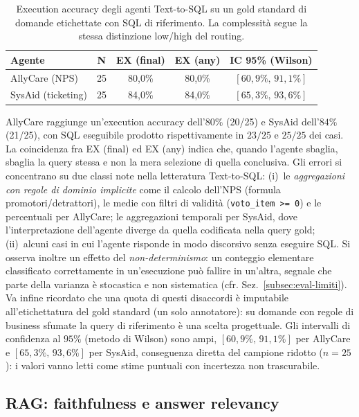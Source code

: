 \begin{table}[htbp]
  \centering
  \caption[Execution accuracy degli agenti Text-to-SQL]{Execution accuracy degli agenti Text-to-SQL su un gold standard di domande etichettate con SQL di riferimento. La complessità segue la stessa distinzione low/high del routing.}
  \label{tab:eval-text2sql}
  \begin{tabular}{lcccc}
    \toprule
    \textbf{Agente} & \textbf{N} & \textbf{EX (final)} & \textbf{EX (any)} & \textbf{IC 95\% (Wilson)} \\
    \midrule
    AllyCare (NPS)      & 25 & 80{,}0\% & 80{,}0\% & $[60{,}9\% ,\, 91{,}1\%]$ \\
    SysAid (ticketing)  & 25 & 84{,}0\% & 84{,}0\% & $[65{,}3\% ,\, 93{,}6\%]$ \\
    \bottomrule
  \end{tabular}
\end{table}

AllyCare raggiunge un'execution accuracy dell'$80\%$ (20/25) e SysAid dell'$84\%$ (21/25), con SQL eseguibile prodotto rispettivamente in $23/25$ e $25/25$ dei casi. 
La coincidenza fra EX (final) ed EX (any) indica che, quando l'agente sbaglia, sbaglia la query stessa e non la mera selezione di quella conclusiva. 
Gli errori si concentrano su due classi note nella letteratura Text-to-SQL: (i)~le \emph{aggregazioni con regole di dominio implicite} come 
il calcolo dell'NPS (formula promotori/detrattori), le medie con filtri di validità (\texttt{voto\_item >= 0}) e le percentuali per AllyCare; 
le aggregazioni temporali per SysAid, dove l'interpretazione dell'agente diverge da quella codificata nella query gold; 
(ii)~alcuni casi in cui l'agente risponde in modo discorsivo senza eseguire SQL. Si osserva inoltre un effetto del \emph{non-determinismo}: 
un conteggio elementare classificato correttamente in un'esecuzione può fallire in un'altra, segnale che parte della varianza è stocastica e non sistematica 
(cfr. Sez.~\ref{subsec:eval-limiti}). Va infine ricordato che una quota di questi disaccordi è imputabile all'etichettatura del gold standard (un solo annotatore): 
su domande con regole di business sfumate la query di riferimento è una scelta progettuale. Gli intervalli di confidenza al $95\%$ (metodo di Wilson) sono ampi, $[60{,}9\%,\,91{,}1\%]$ per AllyCare 
e $[65{,}3\%,\,93{,}6\%]$ per SysAid, conseguenza diretta del campione ridotto ($n=25$): i valori vanno letti come stime puntuali con incertezza non trascurabile.

\subsection{RAG: faithfulness e answer relevancy}
\label{subsec:eval-rag}

